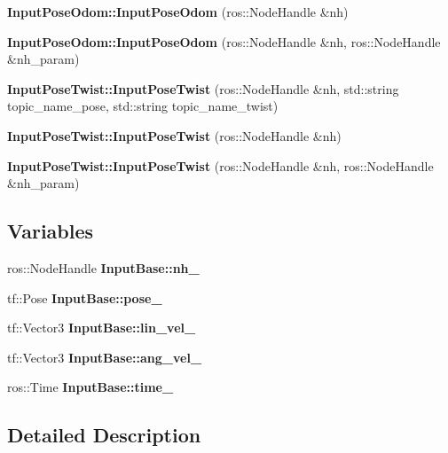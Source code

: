 \begin{DoxyCompactItemize}
\item 
\mbox{\label{group__Input_gaf65f517b5791a223d38d9e08a4c318b5}} 
{\bfseries Input\+Pose\+Odom\+::\+Input\+Pose\+Odom} (ros\+::\+Node\+Handle \&nh)
\item 
\mbox{\label{group__Input_ga178d03771536f57e834e122485d3e73e}} 
{\bfseries Input\+Pose\+Odom\+::\+Input\+Pose\+Odom} (ros\+::\+Node\+Handle \&nh, ros\+::\+Node\+Handle \&nh\+\_\+param)
\item 
\mbox{\label{group__Input_ga81300e68b133bd3df8fabf4d2ea7e4b2}} 
{\bfseries Input\+Pose\+Twist\+::\+Input\+Pose\+Twist} (ros\+::\+Node\+Handle \&nh, std\+::string topic\+\_\+name\+\_\+pose, std\+::string topic\+\_\+name\+\_\+twist)
\item 
\mbox{\label{group__Input_ga118fe4becb20679b5c950827b3b4b449}} 
{\bfseries Input\+Pose\+Twist\+::\+Input\+Pose\+Twist} (ros\+::\+Node\+Handle \&nh)
\item 
\mbox{\label{group__Input_ga0e8c731f5d891db652aabe3d0b6bd92a}} 
{\bfseries Input\+Pose\+Twist\+::\+Input\+Pose\+Twist} (ros\+::\+Node\+Handle \&nh, ros\+::\+Node\+Handle \&nh\+\_\+param)
\end{DoxyCompactItemize}
\subsection*{Variables}
\begin{DoxyCompactItemize}
\item 
\mbox{\label{group__Input_ga0a51906c129d50a4cb72c9490366f908}} 
ros\+::\+Node\+Handle {\bfseries Input\+Base\+::nh\+\_\+}
\item 
\mbox{\label{group__Input_ga6642dbf660c3920565cbe03362cef669}} 
tf\+::\+Pose {\bfseries Input\+Base\+::pose\+\_\+}
\item 
\mbox{\label{group__Input_ga4cdb2c68eb1e92fd506abc3b67e07253}} 
tf\+::\+Vector3 {\bfseries Input\+Base\+::lin\+\_\+vel\+\_\+}
\item 
\mbox{\label{group__Input_gac7b926b7f75cae99eeaa2a59177a2fd6}} 
tf\+::\+Vector3 {\bfseries Input\+Base\+::ang\+\_\+vel\+\_\+}
\item 
\mbox{\label{group__Input_gad07135f935112ff25b7e579dcdc7ff72}} 
ros\+::\+Time {\bfseries Input\+Base\+::time\+\_\+}
\end{DoxyCompactItemize}


\subsection{Detailed Description}
